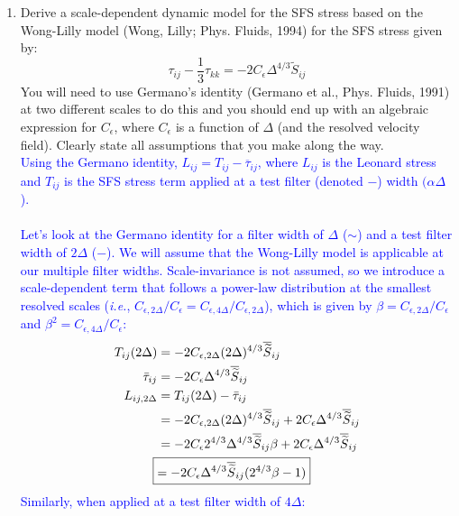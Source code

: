 \documentclass[11pt]{article}
\begin{document}
\begin{enumerate}
\item Derive a scale-dependent dynamic model for the SFS stress based on the Wong-Lilly model (Wong, Lilly; Phys. Fluids, 1994) for the SFS
stress given by:
\begin{displaymath}
\tau_{ij}-\frac{1}{3}\tau_{kk}=-2C_{\epsilon}\Delta^{4/3}\widetilde{S}_{ij}
\end{displaymath}
You will need to use Germano's identity (Germano et al., Phys. Fluids, 1991) at two different scales to do this and you should end up with an algebraic expression for $C_{\epsilon}$, where $C_{\epsilon}$ is a function of $\Delta$ (and the resolved velocity field).  Clearly state all assumptions that you make along the way.\\
\textcolor{blue}{Using the Germano identity, $L_{ij} = T_{ij} - \overline{\tau}_{ij}$, where $L_{ij}$ is the Leonard stress and $T_{ij}$ is the SFS stress term applied at a test filter (denoted $-$) width $(\alpha \Delta$).\\\\
Let's look at the Germano identity for a filter width of $\Delta$ ($\sim$) and a test filter width of $2\Delta$ ($-$). We will assume that the Wong-Lilly model is applicable at our multiple filter widths. Scale-invariance is not assumed, so we introduce a scale-dependent term that follows a power-law distribution at the smallest resolved scales (\textit{i.e.}, $C_{\epsilon, 2\Delta}/C_{\epsilon} = C_{\epsilon, 4\Delta}/C_{\epsilon, 2\Delta}$), which is given by $\beta = C_{\epsilon, 2\Delta}/C_{\epsilon}$ and $\beta^2 = C_{\epsilon, 4\Delta}/C_{\epsilon}$:
\begin{align*}
T_{ij} (2\Delta) &= -2C_{\epsilon, 2\Delta} (2\Delta)^{4/3} \overline{\widetilde{S}}_{ij}\\
\bar \tau_{ij} &= -2C_{\epsilon} \Delta^{4/3} \overline{\widetilde{S}}_{ij}\\
L_{ij, 2\Delta} &= T_{ij} (2\Delta) - \bar \tau_{ij}\\
&= -2C_{\epsilon, 2\Delta} (2\Delta)^{4/3} \overline{\widetilde{S}}_{ij} + 2C_{\epsilon} \Delta^{4/3} \overline{\widetilde{S}}_{ij}\\
&= -2C_{\epsilon} 2^{4/3} \Delta^{4/3} \overline{\widetilde{S}}_{ij} \beta + 2C_{\epsilon} \Delta^{4/3} \overline{\widetilde{S}}_{ij}\\
\Aboxed{&=-2C_{\epsilon} \Delta^{4/3} \overline{\widetilde{S}}_{ij} (2^{4/3}\beta -1)}
\end{align*}
Similarly, when applied at a test filter width of $4\Delta$:
\begin{align*}

\end{align*}}
\end{enumerate}
\end{document}
